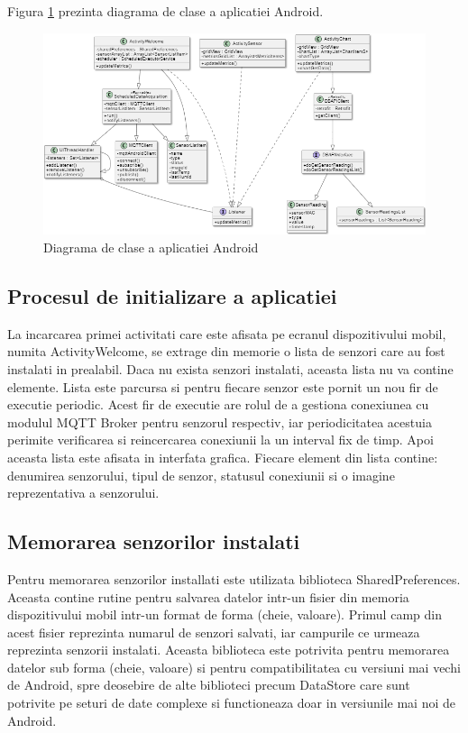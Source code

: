 Figura \ref{fig:AndroidClassDiagram} prezinta diagrama de clase a aplicatiei Android.
\begin{figure}[H]
    \centering
    \includegraphics[scale=0.68]{figs/AndroidClassDiagram.png}
    \caption{Diagrama de clase a aplicatiei Android}
    \label{fig:AndroidClassDiagram}
\end{figure}

\subsection{Procesul de initializare a aplicatiei}\label{subsec:pi_appandroid_initializare}
La incarcarea primei activitati care este afisata pe ecranul dispozitivului mobil, numita ActivityWelcome, se extrage din memorie o lista de senzori care au fost 
instalati in prealabil. Daca nu exista senzori instalati, aceasta lista nu va contine elemente. Lista este parcursa si pentru fiecare senzor este pornit un nou 
fir de executie periodic. Acest fir de executie are rolul de a gestiona conexiunea cu modulul MQTT Broker pentru senzorul respectiv, iar periodicitatea 
acestuia perimite verificarea si reincercarea conexiunii la un interval fix de timp. Apoi aceasta lista este afisata in interfata grafica. Fiecare element din lista 
contine: denumirea senzorului, tipul de senzor, statusul conexiunii si o imagine reprezentativa a senzorului.

\subsection{Memorarea senzorilor instalati}\label{subsec:pi_appandroid_memorare_senzori}
Pentru memorarea senzorilor installati este utilizata biblioteca SharedPreferences. Aceasta contine rutine pentru salvarea datelor intr-un fisier din memoria 
dispozitivului mobil intr-un format de forma (cheie, valoare). Primul camp din acest fisier reprezinta numarul de senzori salvati, iar campurile ce urmeaza 
reprezinta senzorii instalati. Aceasta biblioteca este potrivita pentru memorarea datelor sub forma (cheie, valoare) si pentru compatibilitatea cu versiuni mai 
vechi de Android, spre deosebire de alte biblioteci precum DataStore care sunt potrivite pe seturi de date complexe si functioneaza doar in versiunile mai noi de 
Android.

